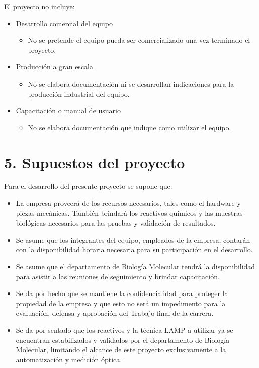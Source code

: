 \documentclass[
11pt, %
]{charter}
\begin{document}
El proyecto no incluye:

\begin{itemize}
	\item Desarrollo comercial del equipo
	\begin{itemize}
		\item No se pretende el equipo pueda ser comercializado una vez terminado el proyecto.
	\end{itemize}
	\item Producción a gran escala
	\begin{itemize}
		\item No se elabora documentación ni se desarrollan indicaciones para la producción industrial del equipo.
	\end{itemize}
		\item Capacitación o manual de usuario
	\begin{itemize}
		\item No se elabora documentación que indique como utilizar el equipo.
	\end{itemize}

	
\end{itemize}


\section{5. Supuestos del proyecto}
\label{sec:supuestos}

Para el desarrollo del presente proyecto se supone que:


\begin{itemize}
		\item La empresa proveerá de los recursos necesarios, tales como el hardware y piezas mecánicas. También brindará los reactivos químicos y las muestras biológicas necesarios para las pruebas y validación de resultados.
		\item Se asume que los integrantes del equipo, empleados de la empresa, contarán con la disponibilidad horaria necesaria para su participación en el desarrollo.
		\item Se asume que el departamento de Biología Molecular tendrá la disponibilidad para asistir a las reuniones de seguimiento y brindar capacitación.
		\item Se da por hecho que se mantiene la confidencialidad para proteger la propiedad de la empresa y que esto no será un impedimento para la evaluación, defensa y aprobación del Trabajo final de la carrera.
		\item Se da por sentado que los reactivos y la técnica LAMP a utilizar ya se encuentran estabilizados y validados por el departamento de Biología Molecular, limitando el alcance de este proyecto exclusivamente a la automatización y medición óptica.

\end{itemize}
\end{document}
